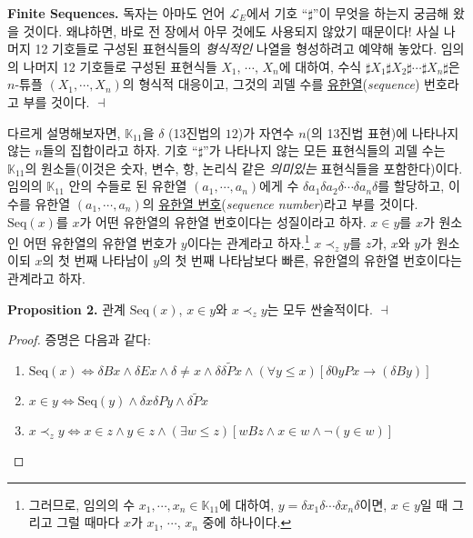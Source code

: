 \documentclass[12pt]{paper}
\newenvironment{context}[1][]
{ \noindent \textbf{{#1}.} }
{ \hfill $ \dashv $ }
\begin{document}
\begin{context}[Finite Sequences]
독자는 아마도 언어 $\mathcal{L}_{E}$에서 기호 ``$\sharp$''이 무엇을 하는지 궁금해 왔을 것이다.
왜냐하면, 바로 전 장에서 아무 것에도 사용되지 않았기 때문이다!
사실 나머지 12 기호들로 구성된 표현식들의 \textit{형식적인} 나열을 형성하려고 예약해 놓았다.
임의의 나머지 12 기호들로 구성된 표현식들 $X_1$, $\cdots$, $X_{n}$에 대하여,
수식 $ \sharp X_1 \sharp X_2 \sharp \cdots \sharp X_{n} \sharp $은
$n$-튜플 $\left( X_{1} , \cdots , X_{n} \right)$의 형식적 대응이고,
그것의 괴델 수를 \underline{유한열}(\textit{sequence}) 번호라고 부를 것이다.
\end{context}

다르게 설명해보자면, $\mathbb{K}_{11}$을 $\delta$ (13진법의 $12$)가 자연수 $n$(의 13진법 표현)에 나타나지 않는 $n$들의 집합이라고 하자.
기호 ``$\sharp$''가 나타나지 않는 모든 표현식들의 괴델 수는 $\mathbb{K}_{11}$의 원소들(이것은 숫자, 변수, 항, 논리식 같은 \textit{의미있는} 표현식들을 포함한다)이다.
임의의 $\mathbb{K}_{11}$ 안의 수들로 된 유한열 $\left( a_{1} , \cdots , a_{n} \right)$에게 수 $\delta a_1 \delta a_2 \delta \cdots \delta a_n \delta$를 할당하고,
이 수를 유한열 $\left( a_{1} , \cdots , a_{n} \right)$의 \underline{유한열 번호}(\textit{sequence number})라고 부를 것이다.
$ \mathrm{Seq} \left( x \right) $를 $x$가 어떤 유한열의 유한열 번호이다는 성질이라고 하자.
$ x \in y $를 $x$가 원소인 어떤 유한열의 유한열 번호가 $y$이다는 관계라고 하자.\footnote
{
그러므로, 임의의 수 $x_{1}, \cdots, x_{n} \in \mathbb{K}_{11}$에 대하여, $y = \delta x_1 \delta \cdots \delta x_{n} \delta$이면,
$x \in y$일 때 그리고 그럴 때마다 $x$가 $x_1$, $\cdots$, $x_n$ 중에 하나이다.
} $ x \prec_{z} y$를 $z$가, $x$와 $y$가 원소이되 $x$의 첫 번째 나타남이 $y$의 첫 번째 나타남보다 빠른, 유한열의 유한열 번호이다는 관계라고 하자.

\begin{context}[Proposition 2]
관계 $\mathrm{Seq} \left( x \right)$, $x \in y$와 $x \prec_{z} y$는 모두 싼술적이다.
\end{context}
\begin{proof}
증명은 다음과 같다:
\begin{enumerate}
\item $\mathrm{Seq} \left( x \right) \iff \delta B x \land \delta E x \land \delta \ne x \land \delta \delta \widetilde{P} x \land \left( \forall y \le x \right) \left[ \delta 0 y P x \rightarrow \left( \delta B y \right) \right]$
\item $x \in y \iff \mathrm{Seq} \left( y \right) \land \delta x \delta P y \land \delta \widetilde{P} x$
\item $x \prec_{z} y \iff x \in z \land y \in z \land \left( \exists w \le z \right) \left[ w B z \land x \in w \land \lnot \left( y \in w \right) \right]$
\end{enumerate}
\end{proof}
\end{document}
